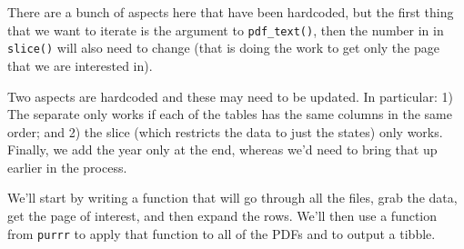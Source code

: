 \documentclass[
]{book}
\newenvironment{Shaded}{\begin{snugshade}}{\end{snugshade}}
\newcommand{\CharTok}[1]{\textcolor[rgb]{0.31,0.60,0.02}{#1}}
\newcommand{\ControlFlowTok}[1]{\textcolor[rgb]{0.13,0.29,0.53}{\textbf{#1}}}
\newcommand{\DataTypeTok}[1]{\textcolor[rgb]{0.13,0.29,0.53}{#1}}
\newcommand{\KeywordTok}[1]{\textcolor[rgb]{0.13,0.29,0.53}{\textbf{#1}}}
\newcommand{\NormalTok}[1]{#1}
\newcommand{\OperatorTok}[1]{\textcolor[rgb]{0.81,0.36,0.00}{\textbf{#1}}}
\newcommand{\OtherTok}[1]{\textcolor[rgb]{0.56,0.35,0.01}{#1}}
\newcommand{\StringTok}[1]{\textcolor[rgb]{0.31,0.60,0.02}{#1}}
\begin{document}
There are a bunch of aspects here that have been hardcoded, but the first thing that we want to iterate is the argument to \texttt{pdf\_text()}, then the number in in \texttt{slice()} will also need to change (that is doing the work to get only the page that we are interested in).

Two aspects are hardcoded and these may need to be updated. In particular: 1) The separate only works if each of the tables has the same columns in the same order; and 2) the slice (which restricts the data to just the states) only works. Finally, we add the year only at the end, whereas we'd need to bring that up earlier in the process.

We'll start by writing a function that will go through all the files, grab the data, get the page of interest, and then expand the rows. We'll then use a function from \texttt{purrr} to apply that function to all of the PDFs and to output a tibble.

\begin{Shaded}
\end{Shaded}
\end{document}
